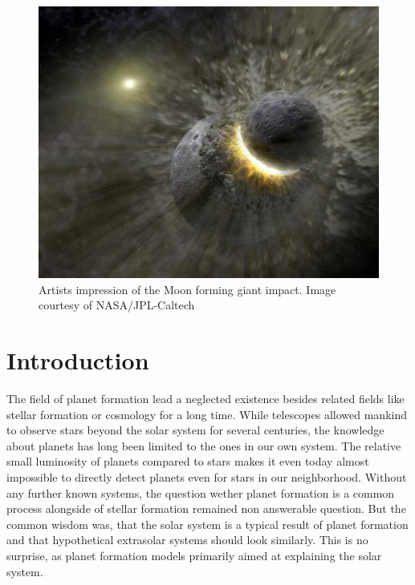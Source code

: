
\begin{figure}
\begin{center}
\includegraphics[scale=0.6]{01figs/01planet-collision.jpg}
\caption{Artists impression of the Moon forming giant impact. Image courtesy of NASA/JPL-Caltech}
\label{ch01_fig01}
\end{center}
\end{figure}


\chapter{Introduction}
\label{ch01}
\graphicspath{{./01figs/}}

The field of planet formation lead a neglected existence besides related fields like stellar formation or cosmology for a long time. While telescopes allowed mankind to observe stars beyond the solar system for several centuries, the knowledge about planets has long been limited to the ones in our own system. The relative small luminosity of planets compared to stars makes it even today almost impossible to directly detect planets even for stars in our neighborhood. Without any further known systems, the question wether planet formation is a common process alongside of stellar formation remained non answerable question. But the common wisdom was, that the solar system is a typical result of planet formation and that hypothetical extrasolar systems should look similarly. This is no surprise, as planet formation models primarily aimed at explaining the solar system.

